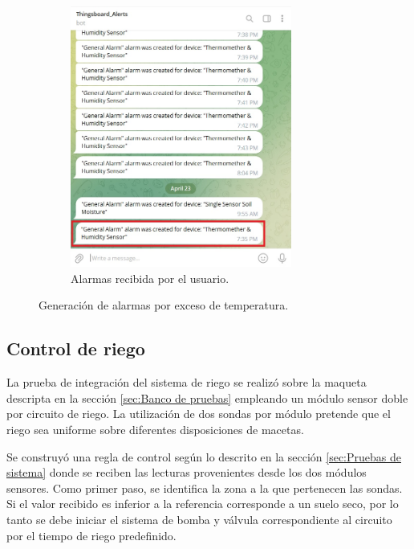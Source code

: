 \begin{figure}[!h]
\begin{subfigure}[b]{0.45\textwidth}
		\includegraphics[width=0.80\textwidth]{./Figures/chapter4/temp_user_alarm.jpg}
		\caption{Alarmas recibida por el usuario.}
		\label{fig:temp_alarm_user}
     \end{subfigure}
     \hfill
        \caption[Generación de alarmas por exceso de temperatura]{Generación de alarmas por exceso de temperatura.}
        \label{fig:tb_clima_automation}
\end{figure}


\pagebreak
\subsection{Control de riego}
\label{sec:Control de riego}

La prueba de integración del sistema de riego se realizó sobre la maqueta descripta en la sección  \ref{sec:Banco de pruebas} empleando un módulo sensor doble por circuito de riego. La utilización de dos sondas por módulo pretende que el riego sea uniforme sobre diferentes disposiciones de macetas. 

Se construyó una regla de control según lo descrito en la sección \ref{sec:Pruebas de sistema} donde se reciben las lecturas provenientes desde los dos módulos sensores. Como primer paso, se identifica la zona a la que pertenecen las sondas. Si el valor recibido es inferior a la referencia corresponde a un suelo seco, por lo tanto se debe iniciar el sistema de bomba y válvula correspondiente al circuito por el tiempo de riego predefinido.


